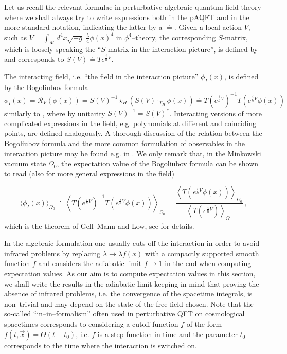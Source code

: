 \documentclass[10pt]{book}
\let\int\int
\newcommand{\Mcal}{\mathcal{M}}
\theoremstyle{break}
\begin{document}
Let us recall the relevant formulae in perturbative algebraic quantum field theory where we shall always try to write expressions both in the pAQFT and in the more standard notation, indicating the latter by a $\doteq$. Given a local action $V$, such as $V=\int_\Mcal d^4x \sqrt{-g} \; \frac{\lambda}{4} \phi(x)^4$ in $\phi^4$--theory, the corresponding $S$-matrix, which is loosely speaking the ``$S$-matrix in the interaction picture'', is defined by %
and corresponds to $S(V)\doteq T e^{\frac{i}{\hbar} V}$.

The interacting field, i.e. ``the field in the interaction picture'' $\phi_I(x)$, is defined by the Bogoliubov formula
\begin{equation}
\phi_I(x)=\mathcal{R}_V(\phi(x))=S(V)^{-1}\star_H\left(S(V)\cdot_{T_H} \phi(x)\right)\doteq T(e^{\frac{i}{\hbar} V})^{-1} T(e^{\frac{i}{\hbar} V}\phi(x))\,
\end{equation}
similarly to %
, where by unitarity $S(V)^{-1}=S(V)^*$. Interacting versions of more complicated expressions in the field, e.g. polynomials at different and coinciding points, are defined analogously. A thorough discussion of the relation between the Bogoliubov formula and the more common formulation of observables in the interaction picture may be found e.g. in %
. We only remark that, in the Minkowski vacuum state $\Omega_0$, the expectation value of the Bogoliubov formula can be shown to read (also for more general expressions in the field)

$$\langle \phi_I(x)\rangle_{\Omega_0} \doteq \left\langle T(e^{\frac{i}{\hbar} V})^{-1}T(e^{\frac{i}{\hbar} V}\phi(x))\right\rangle_{\Omega_0}=\frac{\left\langle T(e^{\frac{i}{\hbar} V}\phi(x))\right\rangle_{\Omega_0}}{\left\langle T(e^{\frac{i}{\hbar} V}) \right\rangle_{\Omega_0}}\,,$$
which is the theorem of Gell--Mann and Low, see %
for details.

In the algebraic formulation one usually cuts off the interaction in order to avoid infrared problems by replacing $\lambda\to \lambda f(x)$ with a compactly supported smooth function $f$ and considers the adiabatic limit $f\to 1$ in the end when computing expectation values. As our aim is to compute expectation values in this section, we shall write the results in the adiabatic limit keeping in mind that proving the absence of infrared problems, i.e. the convergence of the spacetime integrals, is non--trivial and may depend on the state of the free field chosen. Note that the so-called ``in--in--formalism'' often used in perturbative QFT on cosmological spacetimes corresponds to considering a cutoff function $f$ of the form $f(t,\vec{x}) = \Theta(t-t_0)$, i.e. $f$ is a step function in time and the parameter $t_0$ corresponds to the time where the interaction is switched on.
\end{document}

